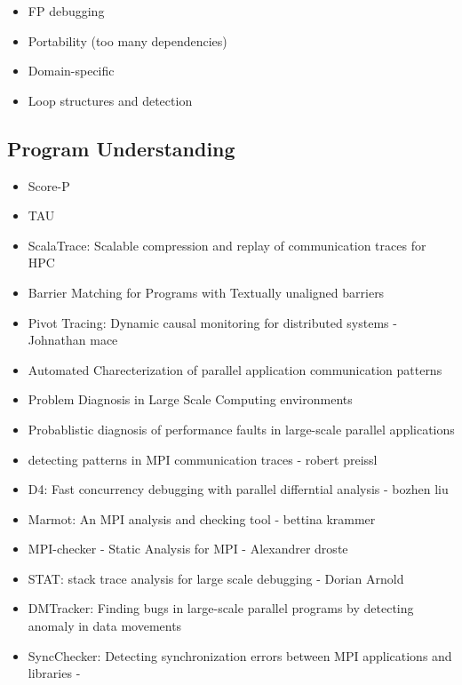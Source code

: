 \begin{itemize}
\item FP debugging
\item Portability (too many dependencies)
\item Domain-specific
\item Loop structures and detection
\end{itemize}
 

\subsection{Program Understanding }



\begin{itemize}
\item Score-P \cite{scorep}
\item TAU \cite{tau}
\item ScalaTrace: Scalable compression and replay of communication traces for HPC  \cite{scalatrace}
\item Barrier Matching for Programs with Textually unaligned barriers \cite{zhang07}
\item Pivot Tracing: Dynamic causal monitoring for distributed systems - Johnathan mace \cite{pivot}
\item Automated Charecterization of parallel application communication patterns \cite{roth-15}
\item Problem Diagnosis in Large Scale Computing environments \cite{miller06}
\item Probablistic diagnosis of performance faults in large-scale parallel applications \cite{laguna-12}
\item detecting patterns in MPI communication traces - robert preissl \cite{preissl-08}
\item D4: Fast concurrency debugging with parallel differntial analysis - bozhen liu \cite{liu-18}
\item Marmot: An MPI analysis and checking tool - bettina krammer \cite{marmot}
\item MPI-checker - Static Analysis for MPI - Alexandrer droste \cite{mpi-checker}
\item STAT: stack trace analysis for large scale debugging - Dorian Arnold \cite{stat}
\item DMTracker: Finding bugs in large-scale parallel programs by detecting anomaly in data movements \cite{dmtracker}
\item SyncChecker: Detecting synchronization errors between MPI applications and libraries - \cite{syncChecker}

\end{itemize}

